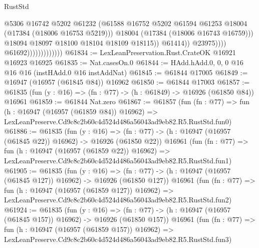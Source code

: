 \begin{lexlean}{RustStd}
\begin{coremodule}
                                                @5306
                                                @16742
                                                @5202
                                                @61232
                                                (@61588
                                                  @16752
                                                  @5202
                                                  @61594
                                                  @61253
                                                  @18004
                                                  (@17384 (@18006 @16753 @5219)))
                                                @18004
                                                (@17384 (@18006 @16743 @16759)))
                                              @18094
                                              @18097
                                              @18100
                                              @18104
                                              @18109
                                              @18115))
                                          @61414))
                                      @23975))))
                              @61692)))))))))))))
@61834 := LexLeanPreservation.Rust.CrateOK @16921 @16923 @16925
@61835 := Nat.casesOn.{0}
@61844 := HAdd.hAdd.{0, 0, 0} @16 @16 @16 (instHAdd.{0} @16 instAddNat)
@61845 := @61844 @17005
@61849 := @16947 (@16957 (@61845 @84)) @16962
@61850 := @61844 @17003
@61857 := @61835 (fun (y : @16) => (fn : @77) -> (h : @61849) -> @16926 (@61850 @84)) @16961
@61859 := @61844 Nat.zero
@61867 := @61857
    (fun (fn : @77) =>
    fun (h : @16947 (@16957 (@61859 @84)) @16962) =>
    LexLeanPreserve.Cd9c8c2b60c4d524d486a56043ad9eb82.R5.RustStd.fun0)
@61886 := @61835
    (fun (y : @16) =>
    (fn : @77) -> (h : @16947 (@16957 (@61845 @22)) @16962) -> @16926 (@61850 @22))
    @16961
    (fun (fn : @77) =>
    fun (h : @16947 (@16957 (@61859 @22)) @16962) =>
    LexLeanPreserve.Cd9c8c2b60c4d524d486a56043ad9eb82.R5.RustStd.fun1)
@61905 := @61835
    (fun (y : @16) =>
    (fn : @77) -> (h : @16947 (@16957 (@61845 @127)) @16962) -> @16926 (@61850 @127))
    @16961
    (fun (fn : @77) =>
    fun (h : @16947 (@16957 (@61859 @127)) @16962) =>
    LexLeanPreserve.Cd9c8c2b60c4d524d486a56043ad9eb82.R5.RustStd.fun2)
@61924 := @61835
    (fun (y : @16) =>
    (fn : @77) -> (h : @16947 (@16957 (@61845 @157)) @16962) -> @16926 (@61850 @157))
    @16961
    (fun (fn : @77) =>
    fun (h : @16947 (@16957 (@61859 @157)) @16962) =>
    LexLeanPreserve.Cd9c8c2b60c4d524d486a56043ad9eb82.R5.RustStd.fun3)

\end{coremodule}
\end{lexlean}
